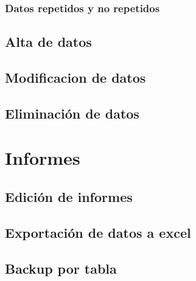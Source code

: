 \documentclass[a4paper,10pt]{article}
\begin{document}
\subsubsection{Datos repetidos y no repetidos}



\subsection{Alta de datos}
\subsection{Modificacion de datos}
\subsection{Eliminación de datos}


\section{Informes}
\subsection{Edición de informes}
\subsection{Exportación de datos a excel}
\subsection{Backup por tabla}
\end{document}
